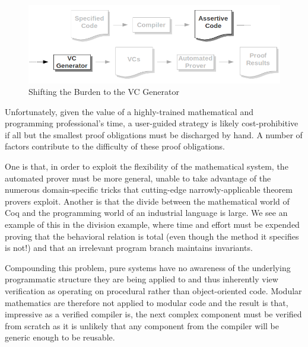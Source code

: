 \begin{figure}
  \centering
    \includegraphics[width=\textwidth]{vcpart}
  \caption{Shifting the Burden to the VC Generator\label{fig:assertivecode}}
\end{figure}

Unfortunately, given the value of a highly-trained mathematical and programming professional's time, a user-guided strategy is likely cost-prohibitive if all but the smallest proof obligations must be discharged by hand.  A number of factors contribute to the difficulty of these proof obligations.

One is that, in order to exploit the flexibility of the mathematical system, the automated prover must be more general, unable to take advantage of the numerous domain-specific tricks that cutting-edge narrowly-applicable theorem provers exploit.  Another is that the divide between the mathematical world of Coq and the programming world of an industrial language is large.  We see an example of this in the division example, where time and effort must be expended proving that the behavioral relation is total (even though the method it specifies is not!) and that an irrelevant program branch maintains invariants.

Compounding this problem, pure systems have no awareness of the underlying programmatic structure they are being applied to and thus inherently view verification as operating on procedural rather than object-oriented code.  Modular mathematics are therefore not applied to modular code and the result is that, impressive as a verified compiler is, the next complex component must be verified from scratch as it is unlikely that any component from the compiler will be generic enough to be reusable.

